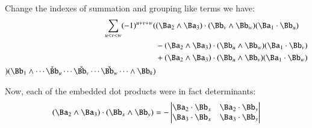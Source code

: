Change the indexes of summation and grouping like terms we have:
\begin{align*}
\sum_{u<v<w} (-1)^{u+v+w} 
(
&(\Ba_2 \wedge \Ba_3) \cdot (\Bb_v \wedge \Bb_w) (\Ba_1 \cdot \Bb_u)  \\
&-(\Ba_2 \wedge \Ba_3) \cdot (\Bb_u \wedge \Bb_w) (\Ba_1 \cdot \Bb_v)  \\
&+(\Ba_2 \wedge \Ba_3) \cdot (\Bb_u \wedge \Bb_v) (\Ba_1 \cdot \Bb_w)  \\
) 
(\Bb_1 \wedge \cdots \check \Bb_u \cdots \check{\Bb_v} \cdots \check{\Bb_w} \cdots \wedge \Bb_k)  \\
\end{align*}

Now, each of the embedded dot products were in fact determinants:
\[
(\Ba_2 \wedge \Ba_3) \cdot (\Bb_x \wedge \Bb_y)
=
-
\begin{vmatrix}
\Ba_2 \cdot \Bb_x & \Ba_2 \cdot \Bb_y \\
\Ba_3 \cdot \Bb_x & \Ba_3 \cdot \Bb_y \\
\end{vmatrix}
\]

